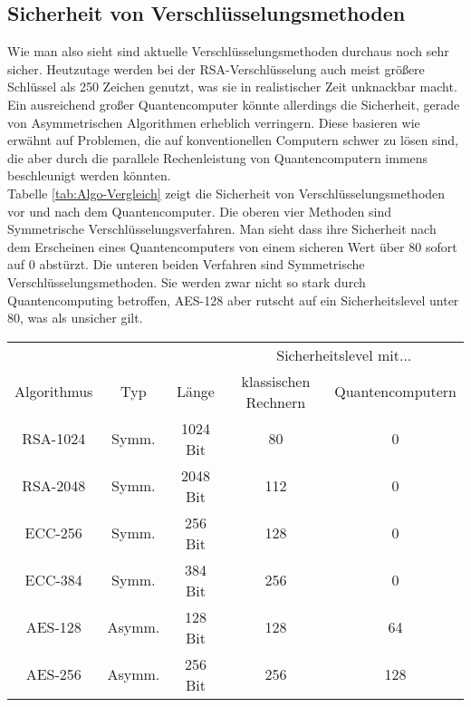 \documentclass[12pt]{IEEEtran}
\begin{document}
\subsection{Sicherheit von Verschlüsselungsmethoden}

Wie man also sieht sind aktuelle Verschlüsselungsmethoden durchaus noch sehr sicher. Heutzutage werden bei der RSA-Verschlüsselung auch meist größere Schlüssel als 250 Zeichen genutzt, was sie in realistischer Zeit unknackbar macht. \\

Ein ausreichend großer Quantencomputer könnte allerdings die Sicherheit, gerade von Asymmetrischen Algorithmen erheblich verringern. Diese basieren wie erwähnt auf Problemen, die auf konventionellen Computern schwer zu lösen sind, die aber durch die parallele Rechenleistung von Quantencomputern immens beschleunigt werden könnten. \\

Tabelle \ref{tab:Algo-Vergleich} zeigt die Sicherheit von Verschlüsselungsmethoden vor und nach dem Quantencomputer. Die oberen vier Methoden sind Symmetrische Verschlüsselungsverfahren. Man sieht dass ihre Sicherheit nach dem Erscheinen eines Quantencomputers von einem sicheren Wert über 80 sofort auf 0 abstürzt. Die unteren beiden Verfahren sind Symmetrische Verschlüsselungsmethoden. Sie werden zwar nicht so stark durch Quantencomputing betroffen, AES-128 aber rutscht auf ein Sicherheitslevel unter 80, was als unsicher gilt. \cite{mavroeidis2018impact}

\begin{table*} [!t]
    \centering
    \caption{Vergleich bekannter Verschlüsselungsalgorithmen. Ab einem Sicherheitslevel von 80 gilt ein Algorithmus als sicher. \cite{mavroeidis2018impact}}
    \label{tab:Algo-Vergleich}
    \begin{tabular}{|c|c|c|c|c|}
    \hline
        & & & \multicolumn{2}{|c|}{Sicherheitslevel mit...} \\
        Algorithmus & Typ & Länge & klassischen Rechnern & Quantencomputern \\
    \hline
        RSA-1024 & Symm. & 1024 Bit & 80 & 0\\
        RSA-2048 & Symm. & 2048 Bit & 112 & 0\\
        ECC-256 & Symm. & 256 Bit & 128 & 0\\
        ECC-384 & Symm. & 384 Bit & 256 & 0\\
        AES-128 & Asymm. & 128 Bit & 128 & 64\\
        AES-256 & Asymm. & 256 Bit & 256 & 128\\
    \hline
    \end{tabular}
\end{table*}
\end{document}
